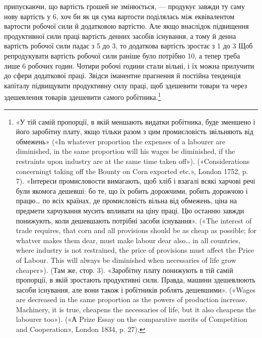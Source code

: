 \parcont{}  %
припускаючи, що вартість грошей не змінюється, — продукує
завжди ту саму нову вартість у 6, хоч би як ця сума
вартости поділялась між еквівалентом вартости робочої сили й
додатковою вартістю. Але якщо внаслідок підвищення продуктивної сили праці
вартість денних засобів існування, а тому й
денна вартість робочої сили падає з 5 до 3, то додаткова
вартість зростає з 1 до 3 Щоб репродукувати
вартість робочої сили раніше було потрібно 10, а тепер треба
лише 6 робочих годин. Чотири робочі години стали вільні, і їх
можна прилучити до сфери додаткової праці. Звідси іманентне
прагнення й постійна тенденція капіталу підвищувати продуктивну
силу праці, щоб здешевити товари та через здешевлення товарів
здешевити самого робітника.\footnote{
«У тій самій пропорції, в якій меншають видатки робітника, буде
зменшено і його заробітну плату, якщо тільки разом з цим промисловість
звільняють від обмежень» («In whatever proportion the expenses of a
labourer are diminished, in the same proportion will his wages be diminished,
if the restraints upon industry are at the same time taken off»).
(«Considerations concerningt taking off the Bounty on Corn exported etc.»,
London 1752, p. 7). «Інтереси промисловости вимагають, щоб хліб і
взагалі всякі харчові речі були якомога дешевші: бо те, що їх робить
дорожчими, робить дорожчою і працю\dots{} по всіх країнах, де промисловість
вільна від обмежень, ціна на предмети харчування мусить впливати
на ціну праці. Цю останню завжди понижують, коли дешевшають потрібні
засоби існування». («The interest of trade requires, that corn and all
provisions should be as cheap as possible; for whatver makes them dear, must
make labour dear also\dots{} in all countries, where industry is not restrained,
the price of provisions must affect the Price of Labour. This will always
be diminished when necessaries of life grow cheaper»). (Там же, стор. 3).
«Заробітну плату понижують в тій самій пропорції, в якій зростають
продуктивні сили. Правда, машини здешевлюють засоби існування, але
вони також і робітників роблять дешевшими». («Wages are decreased
in the same proportion as the powers of production increase. Machinery,
it is true, cheapens the necessaries of life, but it also cheapens the labourer
too»). («А Prize Essay on the comparative merits of Competition and
Cooperation», London 1834, p. 27).
}

